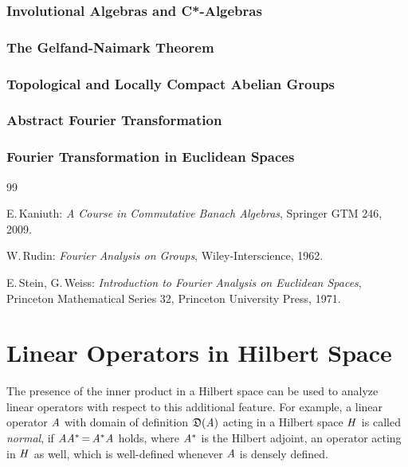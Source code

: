 \documentclass[11pt,twoside]{article}
\begin{document}
\section{Involutional Algebras and C*-Algebras}
\section{The Gelfand-Naimark Theorem}
\section{Topological and Locally Compact Abelian Groups}
\section{Abstract Fourier Transformation}
\section{Fourier Transformation in Euclidean Spaces}

\vspace{5mm}
\begin{thebibliography}{99}
\begin{small}

 E.\,Kaniuth:
\textit{A Course in Commutative Banach Algebras},
Springer GTM 246, 2009.

 W.\,Rudin:
\textit{Fourier Analysis on Groups},
Wiley-Interscience, 1962.

 E.\,Stein, G.\,Weiss:
\textit{Introduction to Fourier Analysis on Euclidean Spaces},
Princeton Mathematical Series 32, Princeton University Press, 1971.

\end{small}
\end{thebibliography}

\newpage
\thispagestyle{empty}
\part{Linear Operators in Hilbert Space}                                       %
The presence of the inner product in a Hilbert space can be used to
analyze linear operators with respect to this additional feature.
For example,
a linear operator $\mathit{A}$ with domain of definition $\mathfrak{D}(\mathit{A})$ acting
in a Hilbert space $\mathit{H}$ is called \textit{normal},
if $\mathit{A} \mathit{A}^* {\,=\,} \mathit{A}^* \mathit{A}$ holds,
where $\mathit{A}^*$ is the Hilbert adjoint, an operator acting in $\mathit{H}$ as well,
which is well-defined whenever $\mathit{A}$ is densely defined.
\end{document}
